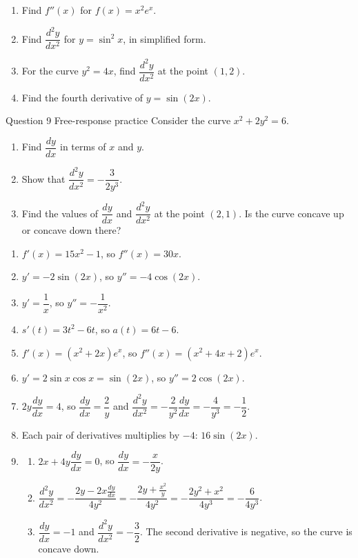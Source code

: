 \documentclass[11pt]{article}
\begin{document}
\begin{enumerate}[leftmargin=*,itemsep=2pt,start=5]
  \item Find $f''(x)$ for $f(x)=x^2e^{x}$.\work{2.8cm}
  \item Find $\dfrac{d^2y}{dx^2}$ for $y=\sin^2x$, in simplified form.\work{2.8cm}
  \item For the curve $y^2=4x$, find $\dfrac{d^2y}{dx^2}$ at the point $(1,2)$.\work{2.8cm}
  \item Find the fourth derivative of $y=\sin(2x)$.\work{2.8cm}
\end{enumerate}

\begin{frbox}{Question 9 \textperiodcentered{} Free-response practice}
Consider the curve $x^2+2y^2=6$.
\begin{enumerate}[label=(\alph*),leftmargin=*,itemsep=2pt]
  \item Find $\dfrac{dy}{dx}$ in terms of $x$ and $y$.\work{2.6cm}
  \item Show that $\dfrac{d^2y}{dx^2}=-\dfrac{3}{2y^3}$.\work{2.6cm}
  \item Find the values of $\dfrac{dy}{dx}$ and $\dfrac{d^2y}{dx^2}$ at the point $(2,1)$. Is the curve concave up or concave down there?\work{2.6cm}
\end{enumerate}
\end{frbox}

\newpage
\begin{solbox}
\begin{enumerate}[leftmargin=*,itemsep=4pt]
  \item $f'(x)=15x^2-1$, so $f''(x)=30x$.
  \item $y'=-2\sin(2x)$, so $y''=-4\cos(2x)$.
  \item $y'=\dfrac1x$, so $y''=-\dfrac{1}{x^2}$.
  \item $s'(t)=3t^2-6t$, so $a(t)=6t-6$.
  \item $f'(x)=\left(x^2+2x\right)e^{x}$, so $f''(x)=\left(x^2+4x+2\right)e^{x}$.
  \item $y'=2\sin x\cos x=\sin(2x)$, so $y''=2\cos(2x)$.
  \item $2y\dfrac{dy}{dx}=4$, so $\dfrac{dy}{dx}=\dfrac2y$ and $\dfrac{d^2y}{dx^2}=-\dfrac{2}{y^2}\dfrac{dy}{dx}=-\dfrac{4}{y^3}=-\dfrac12$.
  \item Each pair of derivatives multiplies by $-4$: $16\sin(2x)$.
  \item \begin{enumerate}[label=(\alph*),leftmargin=*,itemsep=3pt]
    \item $2x+4y\dfrac{dy}{dx}=0$, so $\dfrac{dy}{dx}=-\dfrac{x}{2y}$.
    \item $\dfrac{d^2y}{dx^2}=-\dfrac{2y-2x\frac{dy}{dx}}{4y^2}=-\dfrac{2y+\frac{x^2}{y}}{4y^2}=-\dfrac{2y^2+x^2}{4y^3}=-\dfrac{6}{4y^3}$.
    \item $\dfrac{dy}{dx}=-1$ and $\dfrac{d^2y}{dx^2}=-\dfrac32$. The second derivative is negative, so the curve is concave down.
  \end{enumerate}
\end{enumerate}
\end{solbox}
\end{document}
